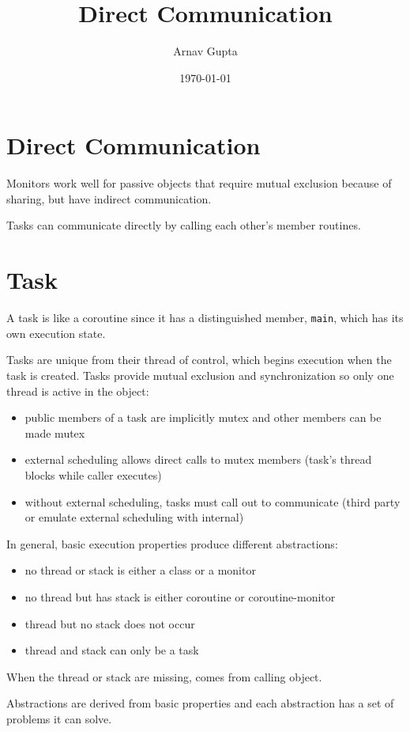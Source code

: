 \documentclass[11pt]{article}
\author{Arnav Gupta}
\date{\today}
\title{Direct Communication}
\begin{document}
\maketitle
\tableofcontents

\section{Direct Communication}
\label{sec:org2aee543}
Monitors work well for passive objects that require mutual exclusion because of sharing, but have
indirect communication.

Tasks can communicate directly by calling each other's member routines.
\section{Task}
\label{sec:orgc8cfb33}
A task is like a coroutine since it has a distinguished member, \texttt{main}, which has its own execution state.

Tasks are unique from their thread of control, which begins execution when the task is created.
Tasks provide mutual exclusion and synchronization so only one thread is active in the object:
\begin{itemize}
\item public members of a task are implicitly mutex and other members can be made mutex
\item external scheduling allows direct calls to mutex members (task's thread blocks while caller executes)
\item without external scheduling, tasks must call out to communicate (third party or emulate external
scheduling with internal)
\end{itemize}

In general, basic execution properties produce different abstractions:
\begin{itemize}
\item no thread or stack is either a class or a monitor
\item no thread but has stack is either coroutine or coroutine-monitor
\item thread but no stack does not occur
\item thread and stack can only be a task
\end{itemize}

When the thread or stack are missing, comes from calling object.

Abstractions are derived from basic properties and each abstraction has a set of problems it can solve.
\end{document}
